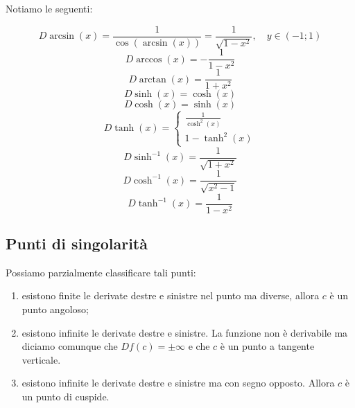 \documentclass[a4paper]{article}
\begin{document}

\pagebreak

Notiamo le seguenti:

\[
    D\arcsin(x) = \frac{1}{\cos(\arcsin(x))}
    = \frac{1}{\sqrt{1 - x^2}}, \quad y \in (-1;1)
\]
\[
    D\arccos(x) = -\frac{1}{1 - x^2}
\]
\[
    D\arctan(x) = \frac{1}{1+x^2}
\]
\[
    D\sinh(x) = \cosh(x)
\]
\[
    D\cosh(x) = \sinh(x)
\]
\[
    D\tanh(x) = \begin{cases}
        \frac{1}{\cosh^2(x)} \\
        1 - \tanh^2(x)
    \end{cases}
\]
\[
    D\sinh^{-1}(x) = \frac{1}{\sqrt{1 + x^2}}
\]
\[
    D\cosh^{-1}(x) = \frac{1}{\sqrt{x^2 - 1}}
\]
\[
    D\tanh^{-1}(x) = \frac{1}{1-x^2}
\]

\subsection{Punti di singolarità}


Possiamo parzialmente classificare tali punti:
\begin{enumerate}
    \item esistono finite le derivate destre e sinistre nel punto ma diverse, allora
        \(c\) è un punto angoloso;
    \item esistono infinite le derivate destre e sinistre. La funzione non è derivabile ma diciamo
    comunque che \(Df(c) = \pm \infty\) e che \(c\) è un punto a tangente verticale.
    \item esistono infinite le derivate destre e sinistre ma con segno opposto.
        Allora \(c\) è un punto di cuspide.
\end{enumerate}
\end{document}
